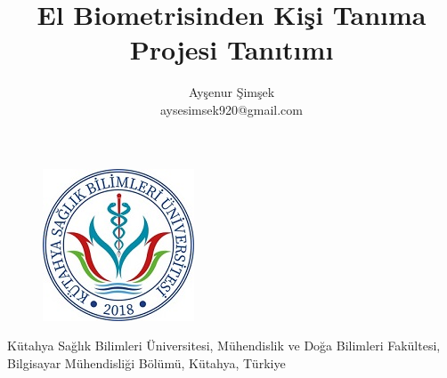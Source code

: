 \documentclass[11pt, a4paper]{article}
\title{El Biometrisinden Kişi Tanıma Projesi Tanıtımı}
\author{Ayşenur Şimşek\\ {aysesimsek920@gmail.com}}
\begin{document}
	
	\begin{figure}
		\centering
		\includegraphics{ksbu.png}
	\end{figure}
	
	\maketitle
	
	\begin{center}
		Kütahya Sağlık Bilimleri Üniversitesi, Mühendislik ve Doğa Bilimleri Fakültesi, Bilgisayar Mühendisliği Bölümü, Kütahya, Türkiye \newline \newline
	\end{center}
	
	
\end{document}
